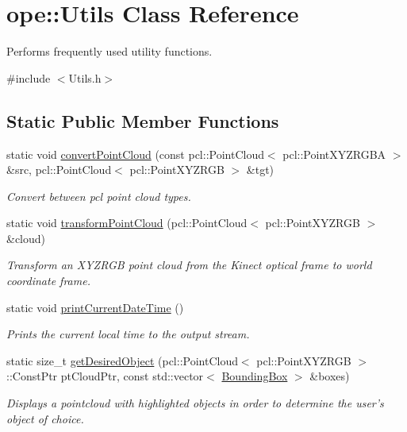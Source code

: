 \hypertarget{classope_1_1_utils}{\section{ope\-:\-:Utils Class Reference}
\label{classope_1_1_utils}
}


Performs frequently used utility functions.  




{\ttfamily \#include $<$Utils.\-h$>$}

\subsection*{Static Public Member Functions}
\begin{DoxyCompactItemize}
\item 
static void \hyperlink{classope_1_1_utils_a6c7d217f7eefe013e2d2a08663b2d0dd}{convert\-Point\-Cloud} (const pcl\-::\-Point\-Cloud$<$ pcl\-::\-Point\-X\-Y\-Z\-R\-G\-B\-A $>$ \&src, pcl\-::\-Point\-Cloud$<$ pcl\-::\-Point\-X\-Y\-Z\-R\-G\-B $>$ \&tgt)
\begin{DoxyCompactList}\small\item\em Convert between pcl point cloud types. \end{DoxyCompactList}\item 
static void \hyperlink{classope_1_1_utils_a88e292fa3c280d40ddccdf63412d77c2}{transform\-Point\-Cloud} (pcl\-::\-Point\-Cloud$<$ pcl\-::\-Point\-X\-Y\-Z\-R\-G\-B $>$ \&cloud)
\begin{DoxyCompactList}\small\item\em Transform an X\-Y\-Z\-R\-G\-B point cloud from the Kinect optical frame to world coordinate frame. \end{DoxyCompactList}\item 
\hypertarget{classope_1_1_utils_a9fb4657c9ec6b57e03d1d7eefc14da08}{static void \hyperlink{classope_1_1_utils_a9fb4657c9ec6b57e03d1d7eefc14da08}{print\-Current\-Date\-Time} ()}\label{classope_1_1_utils_a9fb4657c9ec6b57e03d1d7eefc14da08}

\begin{DoxyCompactList}\small\item\em Prints the current local time to the output stream. \end{DoxyCompactList}\item 
\hypertarget{classope_1_1_utils_a93d2b83a94db71e0058c02226d64375e}{static size\-\_\-t \hyperlink{classope_1_1_utils_a93d2b83a94db71e0058c02226d64375e}{get\-Desired\-Object} (pcl\-::\-Point\-Cloud$<$ pcl\-::\-Point\-X\-Y\-Z\-R\-G\-B $>$\-::Const\-Ptr pt\-Cloud\-Ptr, const std\-::vector$<$ \hyperlink{classope_1_1_bounding_box}{Bounding\-Box} $>$ \&boxes)}\label{classope_1_1_utils_a93d2b83a94db71e0058c02226d64375e}

\begin{DoxyCompactList}\small\item\em Displays a pointcloud with highlighted objects in order to determine the user's object of choice. \end{DoxyCompactList}\end{DoxyCompactItemize}


